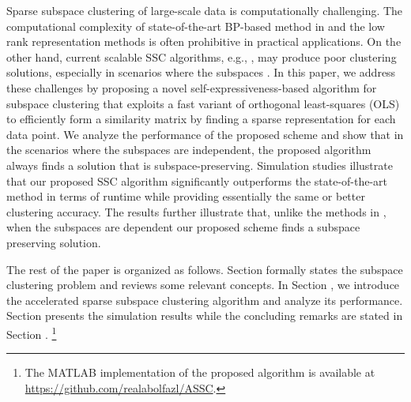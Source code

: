 Sparse subspace clustering of large-scale data is computationally challenging. The computational complexity of state-of-the-art BP-based method in \cite{elhamifar2009sparse} and the low rank representation methods \cite{lu2012robust,liu2013robust,favaro2011closed,vidal2014low} is often prohibitive in practical applications. On the other hand, current scalable SSC algorithms, e.g., \cite{dyer2013greedy,you2015sparse}, may produce poor clustering solutions, especially in scenarios where the subspaces {\color{black}{are not well separated}}.
In this paper, we address these challenges by proposing a novel self-expressiveness-based algorithm for subspace clustering that exploits a fast variant of orthogonal least-squares (OLS) to efficiently form a similarity matrix by finding a sparse representation for each data point. We analyze the performance of the proposed scheme and show that in the scenarios where the subspaces are independent, the proposed algorithm always finds a solution that is subspace-preserving. Simulation studies illustrate that our proposed SSC algorithm significantly outperforms the state-of-the-art method \cite{elhamifar2009sparse} in terms of runtime while providing essentially the same or better clustering accuracy. The results further illustrate that, unlike the methods in \cite{elhamifar2009sparse,dyer2013greedy,you2015sparse}, when the subspaces are dependent our
proposed scheme finds a subspace preserving solution.

The rest of the paper is organized as follows. Section  formally states the subspace clustering problem and reviews some relevant concepts. In Section , we introduce the accelerated sparse subspace clustering algorithm and analyze its performance. Section  presents the simulation results while the concluding remarks are stated in Section . \footnote{The MATLAB implementation of the proposed algorithm is available at \url{https://github.com/realabolfazl/ASSC}.}